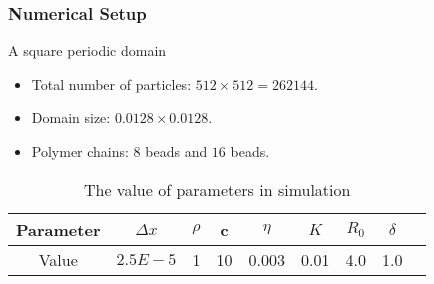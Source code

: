 \begin{frame}
\frametitle{Numerical Setup} 
\begin{block}{A square periodic domain}
 \begin{itemize}
  \item Total number of particles: $512 \times 512 = 262144$.
  \item Domain size: $ 0.0128\times 0.0128$.
  \item Polymer chains: $8$ beads and $16$ beads.
 \end{itemize}
\begin{table}
\begin{center}
  \begin{tabular}{| c | c | c |  c| c | c | c | c | c |}
    \hline
    Parameter & $\Delta x$ & $\rho$ & c & $\eta$ & $K$ & $R_0$ & $\delta$ \\ 
    \hline
    Value & $2.5E-5$ & 1 & 10 & 0.003 & 0.01 & 4.0 & 1.0 \\ 
   \hline
  \end{tabular}
\end{center}
\caption {The value of parameters in simulation}
\label{tab:roll}
\end{table}
\end{block}
\end{frame}



